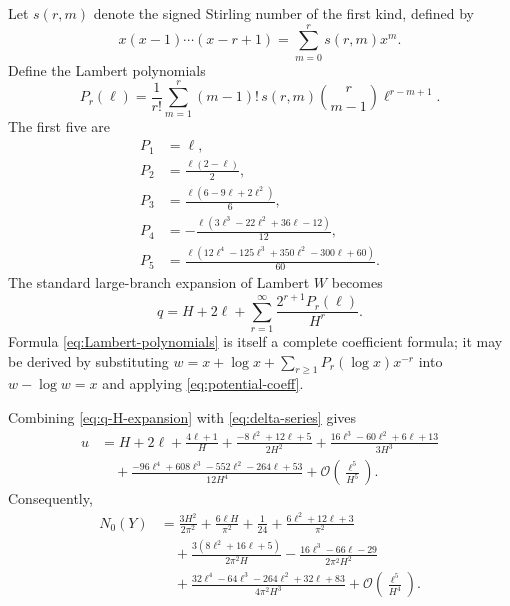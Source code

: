 \documentclass[11pt]{article}
\numberwithin{equation}{section}
\theoremstyle{mainthm}
\theoremstyle{defstyle}
\theoremstyle{remark}
\newcommand{\cO}{\mathcal O}
\begin{document}
Let \(s(r,m)\) denote the signed Stirling number of the first kind, defined by
\begin{equation}\label{eq:signed-stirling}
 x(x-1)\cdots(x-r+1)=\sum_{m=0}^{r}s(r,m)x^m.
\end{equation}
Define the Lambert polynomials
\begin{equation}\label{eq:Lambert-polynomials}
 P_r(\ell)=\frac1{r!}\sum_{m=1}^{r}
 (m-1)!\,s(r,m)\binom r{m-1}\ell^{r-m+1}.
\end{equation}
The first five are
\begin{align}
 P_1&=\ell,\nonumber\\
 P_2&=\frac{\ell(2-\ell)}2,\nonumber\\
 P_3&=\frac{\ell(6-9\ell+2\ell^2)}6,\label{eq:P-first}\\
 P_4&=-\frac{\ell(3\ell^3-22\ell^2+36\ell-12)}{12},\nonumber\\
 P_5&=\frac{\ell(12\ell^4-125\ell^3+350\ell^2-300\ell+60)}{60}.
\end{align}
The standard large-branch expansion of Lambert \(W\) \cite{CorlessEtAl} becomes
\begin{equation}\label{eq:q-H-expansion}
 \boxed{
 q=H+2\ell+\sum_{r=1}^{\infty}\frac{2^{r+1}P_r(\ell)}{H^r}.}
\end{equation}
Formula \eqref{eq:Lambert-polynomials} is itself a complete coefficient formula; it may be derived by substituting
\(
 w=x+\log x+\sum_{r\ge1}P_r(\log x)x^{-r}
\)
into \(w-\log w=x\) and applying \eqref{eq:potential-coeff}.

Combining \eqref{eq:q-H-expansion} with \eqref{eq:delta-series} gives
\begin{align}
 u
 &=H+2\ell+\frac{4\ell+1}{H}
 +\frac{-8\ell^2+12\ell+5}{2H^2}
 +\frac{16\ell^3-60\ell^2+6\ell+13}{3H^3}\nonumber\\
 &\quad+\frac{-96\ell^4+608\ell^3-552\ell^2-264\ell+53}{12H^4}
 +\cO\!\left(\frac{\ell^5}{H^5}\right).
 \label{eq:u-H-expansion}
\end{align}
Consequently,
\begin{align}
 N_0(Y)
 &=\frac{3H^2}{2\pi^2}+\frac{6\ell H}{\pi^2}
 +\frac1{24}+\frac{6\ell^2+12\ell+3}{\pi^2}\nonumber\\
 &\quad+\frac{3(8\ell^2+16\ell+5)}{2\pi^2H}
 -\frac{16\ell^3-66\ell-29}{2\pi^2H^2}\nonumber\\
 &\quad+\frac{32\ell^4-64\ell^3-264\ell^2+32\ell+83}{4\pi^2H^3}
 +\cO\!\left(\frac{\ell^5}{H^4}\right).
 \label{eq:N0-H-expansion}
\end{align}
\end{document}
